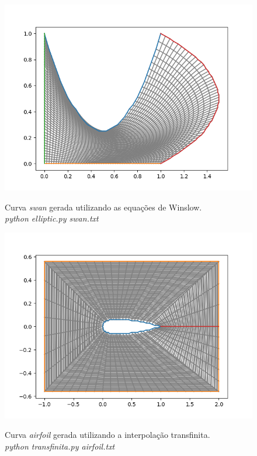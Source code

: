 \documentclass[a4paper]{article}
\begin{document}
\begin{figure}[]
	\centering
	\includegraphics[width=1.0\textwidth]{swan_elliptic.png}
	\label{fig:swan_elliptic} 
	\caption[caption]{Curva \textit{swan} gerada utilizando as equações de Winslow. \\\hspace{\textwidth} \textit{python elliptic.py swan.txt}}
\end{figure}



\begin{figure}[]
	\centering
	\includegraphics[width=1.0\textwidth]{airfoil_transfinita.png}
	\label{fig:airfoil_transfinita} 
	\caption[caption]{Curva \textit{airfoil} gerada utilizando a interpolação transfinita. \\\hspace{\textwidth} \textit{python transfinita.py airfoil.txt}}
\end{figure}
\end{document}
